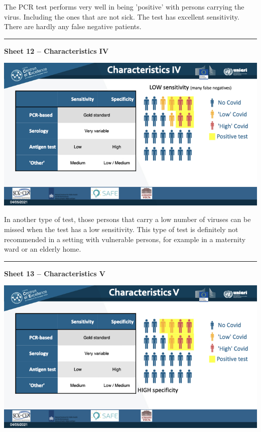 \documentclass[
]{book}
\newcommand{\RL}[1]{\beginR #1\endR}
\begin{document}
The PCR test performs very well in being
\RL{'}positive\RL{'} with persons carrying the virus.
Including the ones that are not sick. The test has excellent
sensitivity. There are hardly any false negative patients.

\begin{center}\rule{0.5\linewidth}{0.5pt}\end{center}

\textbf{Sheet 12 -- Characteristics IV}

\includegraphics{images/m02/m02_types_of_rapid_tests_final.012.jpeg}

In another type of test, those persons that carry a low number of
viruses can be missed when the test has a low sensitivity. This type of
test is definitely not recommended in a setting with vulnerable persons,
for example in a maternity ward or an elderly home.

\begin{center}\rule{0.5\linewidth}{0.5pt}\end{center}

\textbf{Sheet 13 -- Characteristics V}

\includegraphics{images/m02/m02_types_of_rapid_tests_final.013.jpeg}
\end{document}

